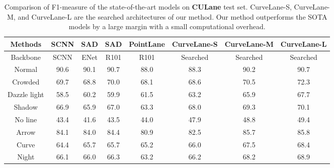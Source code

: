 \documentclass[runningheads]{llncs}
\providecommand{\tabularnewline}{\\}
\begin{document}
\begin{table}[tb]


\caption{\label{tab:Performance-on-CULane}Comparison of F1-measure of the
state-of-the-art models on \textbf{CULane} test set. CurveLane-S,
CurveLane-M, and CurveLane-L are the searched architectures of our
method. Our method outperforms the SOTA models by a large margin with
a small computational overhead.}


\begin{centering}
{\scriptsize{}\tabcolsep 0.00005in}\begin{tabular}{c|cccc|ccc}
\hline 
{\scriptsize{}Methods} & {\scriptsize{}SCNN\cite{pan2018spatial}} & {\scriptsize{}SAD\cite{hou2019learning}} & {\scriptsize{}SAD} & {\scriptsize{}PointLane\cite{chen2019pointlanenet}} & \textbf{\scriptsize{}CurveLane-S} & \textbf{\scriptsize{}CurveLane-M} & \textbf{\scriptsize{}CurveLane-L}\tabularnewline
\hline 
{\scriptsize{}Backbone} & {\scriptsize{}SCNN} & {\scriptsize{}ENet } & {\scriptsize{}R101} & {\scriptsize{}R101 } & {\scriptsize{}Searched} & {\scriptsize{}Searched} & {\scriptsize{}Searched}\tabularnewline
\hline 
{\scriptsize{}Normal} & {\scriptsize{}90.6} & {\scriptsize{}90.1} & {\scriptsize{}90.7} & {\scriptsize{}88.0} & {\scriptsize{}88.3} & {\scriptsize{}90.2} & {\scriptsize{}90.7}\tabularnewline
{\scriptsize{}Crowded} & {\scriptsize{}69.7} & {\scriptsize{}68.8} & {\scriptsize{}70.0} & {\scriptsize{}68.1} & {\scriptsize{}68.6} & {\scriptsize{}70.5} & {\scriptsize{}72.3}\tabularnewline
{\scriptsize{}Dazzle light} & {\scriptsize{}58.5} & {\scriptsize{}60.2} & {\scriptsize{}59.9} & {\scriptsize{}61.5} & {\scriptsize{}63.2} & {\scriptsize{}65.9} & {\scriptsize{}67.7}\tabularnewline
{\scriptsize{}Shadow} & {\scriptsize{}66.9} & {\scriptsize{}65.9} & {\scriptsize{}67.0} & {\scriptsize{}63.3} & {\scriptsize{}68.0} & {\scriptsize{}69.3} & {\scriptsize{}70.1}\tabularnewline
{\scriptsize{}No line} & {\scriptsize{}43.4} & {\scriptsize{}41.6} & {\scriptsize{}43.5} & {\scriptsize{}44.0} & {\scriptsize{}47.9} & {\scriptsize{}48.8} & {\scriptsize{}49.4}\tabularnewline
{\scriptsize{}Arrow} & {\scriptsize{}84.1} & {\scriptsize{}84.0} & {\scriptsize{}84.4} & {\scriptsize{}80.9} & {\scriptsize{}82.5} & {\scriptsize{}85.7} & {\scriptsize{}85.8}\tabularnewline
{\scriptsize{}Curve} & {\scriptsize{}64.4} & {\scriptsize{}65.7} & {\scriptsize{}65.7} & {\scriptsize{}65.2} & {\scriptsize{}66.0} & {\scriptsize{}67.5} & {\scriptsize{}68.4}\tabularnewline
{\scriptsize{}Night} & {\scriptsize{}66.1} & {\scriptsize{}66.0} & {\scriptsize{}66.3} & {\scriptsize{}63.2} & {\scriptsize{}66.2} & {\scriptsize{}68.2} & {\scriptsize{}68.9}\tabularnewline

\end{tabular}
\end{centering}
\end{table}
\end{document}
